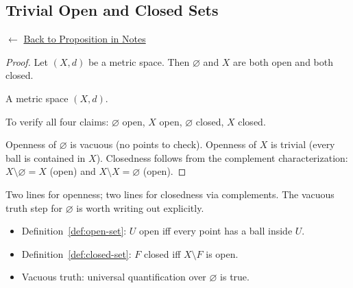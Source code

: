 
\subsection*{Trivial Open and Closed Sets}
\label{prf:trivial-open-closed}

\begin{remark*}[Return]
$\leftarrow$ \hyperref[prop:trivial-open-closed]{Back to Proposition in Notes}
\end{remark*}

\begin{proof}
\Claim Let $(X,d)$ be a metric space.
Then $\varnothing$ and $X$ are both open and both closed.

\Given A metric space $(X,d)$.

\Goal To verify all four claims: $\varnothing$ open, $X$ open,
$\varnothing$ closed, $X$ closed.

\Strategy Openness of $\varnothing$ is vacuous (no points to check).
Openness of $X$ is trivial (every ball is contained in $X$).
Closedness follows from the complement characterization:
$X \setminus \varnothing = X$ (open) and $X \setminus X = \varnothing$ (open).


\end{proof}

\begin{remark*}
Two lines for openness; two lines for closedness via complements.
The vacuous truth step for $\varnothing$ is worth writing out explicitly.
\end{remark*}

\begin{remark*}[Dependencies]
\begin{itemize}
  \item Definition~\ref{def:open-set}: $U$ open iff every point has a ball inside $U$.
  \item Definition~\ref{def:closed-set}: $F$ closed iff $X \setminus F$ is open.
  \item Vacuous truth: universal quantification over $\varnothing$ is true.
\end{itemize}
\end{remark*}

